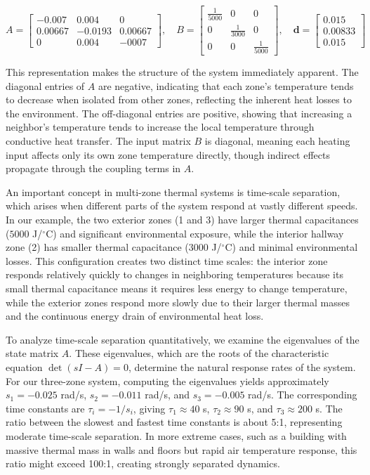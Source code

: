 $$A = \begin{bmatrix}
-0.007 & 0.004 & 0 \\
0.00667 & -0.0193 & 0.00667 \\
0 & 0.004 & -0007
\end{bmatrix}, \quad
B = \begin{bmatrix}
\frac{1}{5000} & 0 & 0 \\
0 & \frac{1}{3000} & 0 \\
0 & 0 & \frac{1}{5000}
\end{bmatrix}, \quad
\mathbf{d} = \begin{bmatrix}
0.015 \\ 0.00833 \\ 0.015
\end{bmatrix}$$

This representation makes the structure of the system immediately apparent. The diagonal entries of $A$ are negative, indicating that each zone's temperature tends to decrease when isolated from other zones, reflecting the inherent heat losses to the environment. The off-diagonal entries are positive, showing that increasing a neighbor's temperature tends to increase the local temperature through conductive heat transfer. The input matrix $B$ is diagonal, meaning each heating input affects only its own zone temperature directly, though indirect effects propagate through the coupling terms in $A$.

An important concept in multi-zone thermal systems is time-scale separation, which arises when different parts of the system respond at vastly different speeds. In our example, the two exterior zones (1 and 3) have larger thermal capacitances ($5000$ J/$\!^\circ$C) and significant environmental exposure, while the interior hallway zone (2) has smaller thermal capacitance ($3000$ J/$\!^\circ$C) and minimal environmental losses. This configuration creates two distinct time scales: the interior zone responds relatively quickly to changes in neighboring temperatures because its small thermal capacitance means it requires less energy to change temperature, while the exterior zones respond more slowly due to their larger thermal masses and the continuous energy drain of environmental heat loss.

To analyze time-scale separation quantitatively, we examine the eigenvalues of the state matrix $A$. These eigenvalues, which are the roots of the characteristic equation $\det(sI - A) = 0$, determine the natural response rates of the system. For our three-zone system, computing the eigenvalues yields approximately $s_1 = -0.025$ rad/s, $s_2 = -0.011$ rad/s, and $s_3 = -0.005$ rad/s. The corresponding time constants are $\tau_i = -1/s_i$, giving $\tau_1 \approx 40$ s, $\tau_2 \approx 90$ s, and $\tau_3 \approx 200$ s. The ratio between the slowest and fastest time constants is about 5:1, representing moderate time-scale separation. In more extreme cases, such as a building with massive thermal mass in walls and floors but rapid air temperature response, this ratio might exceed 100:1, creating strongly separated dynamics.

